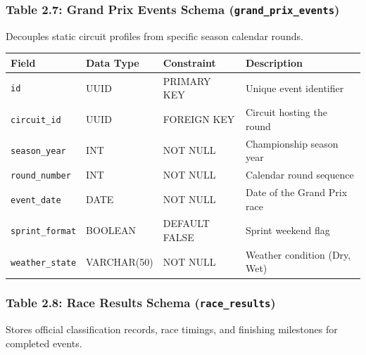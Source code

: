 \documentclass[12pt,a4paper]{report}
\begin{document}
\newpage
\subsubsection*{Table 2.7: Grand Prix Events Schema (\textnormal{\texttt{grand\_prix\_events}})}
Decouples static circuit profiles from specific season calendar rounds.

\begin{table}[H]
\centering
\small
\begin{tabularx}{\textwidth}{l p{2.6cm} p{2.6cm} X}
\toprule
\rowcolor{gray!15}
\textbf{Field} & \textbf{Data Type} & \textbf{Constraint} & \textbf{Description} \\
\midrule
\texttt{id} & UUID & PRIMARY KEY & Unique event identifier \\
\texttt{circuit\_id} & UUID & FOREIGN KEY & Circuit hosting the round \\
\texttt{season\_year} & INT & NOT NULL & Championship season year \\
\texttt{round\_number} & INT & NOT NULL & Calendar round sequence \\
\texttt{event\_date} & DATE & NOT NULL & Date of the Grand Prix race \\
\texttt{sprint\_format} & BOOLEAN & DEFAULT FALSE & Sprint weekend flag \\
\texttt{weather\_state} & VARCHAR(50) & NOT NULL & Weather condition (Dry, Wet) \\
\bottomrule
\end{tabularx}
\end{table}

\vspace{0.3cm}
\subsubsection*{Table 2.8: Race Results Schema (\textnormal{\texttt{race\_results}})}
Stores official classification records, race timings, and finishing milestones for completed events.
\end{document}
